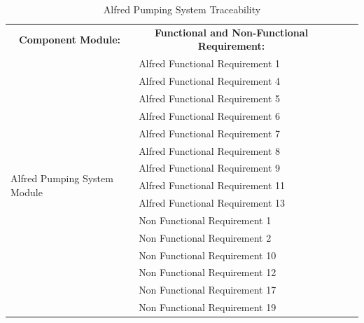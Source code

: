 \documentclass [10pt]{article}
\begin{document}
\begin{table}[h!]
\centering
\begin{tabular}{lllll}
\cline{1-2}
\multicolumn{1}{|c|}{\textbf{Component Module:}} & \multicolumn{1}{c|}{\textbf{Functional and Non-Functional Requirement:}} &  &  &  \\ \cline{1-2}
\multicolumn{1}{|l|}{\multirow{15}{*}{Alfred Pumping System Module}} & \multicolumn{1}{l|}{Alfred Functional Requirement 1} &  &  &  \\ \cline{2-2}
\multicolumn{1}{|l|}{} & \multicolumn{1}{l|}{Alfred Functional Requirement 4} &  &  &  \\ \cline{2-2}
\multicolumn{1}{|l|}{} & \multicolumn{1}{l|}{Alfred Functional Requirement 5} &  &  &  \\ \cline{2-2}
\multicolumn{1}{|l|}{} & \multicolumn{1}{l|}{Alfred Functional Requirement 6} &  &  &  \\ \cline{2-2}
\multicolumn{1}{|l|}{} & \multicolumn{1}{l|}{Alfred Functional Requirement 7} &  &  &  \\ \cline{2-2}
\multicolumn{1}{|l|}{} & \multicolumn{1}{l|}{Alfred Functional Requirement 8} &  &  &  \\ \cline{2-2}
\multicolumn{1}{|l|}{} & \multicolumn{1}{l|}{Alfred Functional Requirement 9} &  &  &  \\ \cline{2-2}
\multicolumn{1}{|l|}{} & \multicolumn{1}{l|}{Alfred Functional Requirement 11} &  &  &  \\ \cline{2-2}
\multicolumn{1}{|l|}{} & \multicolumn{1}{l|}{Alfred Functional Requirement 13} &  &  &  \\ \cline{2-2}
\multicolumn{1}{|l|}{} & \multicolumn{1}{l|}{Non Functional Requirement 1} &  &  &  \\ \cline{2-2}
\multicolumn{1}{|l|}{} & \multicolumn{1}{l|}{Non Functional Requirement 2} &  &  &  \\ \cline{2-2}
\multicolumn{1}{|l|}{} & \multicolumn{1}{l|}{Non Functional Requirement 10} &  &  &  \\ \cline{2-2}
\multicolumn{1}{|l|}{} & \multicolumn{1}{l|}{Non Functional Requirement 12} &  &  &  \\ \cline{2-2}
\multicolumn{1}{|l|}{} & \multicolumn{1}{l|}{Non Functional Requirement 17} &  &  &  \\ \cline{2-2}
\multicolumn{1}{|l|}{} & \multicolumn{1}{l|}{Non Functional Requirement 19} &  &  &  \\ \cline{1-2} 
\end{tabular}
\caption{Alfred Pumping System Traceability}
\end{table}
\end{document}
